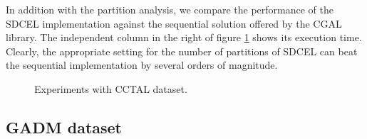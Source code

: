 In addition with the partition analysis, we compare the performance of the SDCEL implementation against the sequential solution offered by the CGAL library.  The independent column in the right of figure \ref{fig:ca} shows its execution time.  Clearly, the appropriate setting for the number of partitions of SDCEL can beat the sequential implementation by several orders of magnitude.

\begin{figure}[!ht]
    \centering
    \hfill
    \caption{Experiments with CCTAL dataset. \label{fig:ca}} 
\end{figure}

\subsection{GADM dataset}


